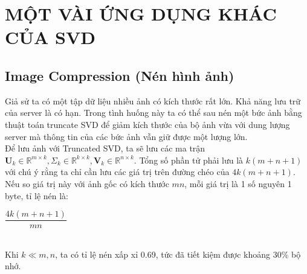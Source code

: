 \section{MỘT VÀI ỨNG DỤNG KHÁC CỦA SVD}
\subsection{Image Compression (Nén hình ảnh)}

Giả sử ta có một tập dữ liệu nhiều ảnh có kích thước rất lớn. Khả năng lưu trữ của server là có hạn. Trong tình huống này ta có thể sau nén một bức ảnh bằng thuật toán truncate SVD để giảm kích thước của bộ ảnh vừa với dung lượng server mà thông tin của các bức ảnh vẫn giữ được một lượng lớn.\\
Để lưu ảnh với Truncated SVD, ta sẽ lưu các ma trận $\mathbf{U}_k \in \mathbb{R}^{m \times k}, \Sigma_k \in \mathbb{R}^{k \times k}, \mathbf{V}_k \in \mathbb{R}^{n \times k}$. Tổng số phần tử phải lưu là $k(m + n + 1)$ với chú ý rằng ta chỉ cần lưu các giá trị trên đường chéo của $4k(m + n + 1)$. Nếu so giá trị này với ảnh gốc có kích thước $mn$, mỗi giá trị là 1 số nguyên 1 byte, tỉ lệ nén là:\\
\begin{center}
	$
	\dfrac{4k(m + n + 1)}{mn}$
\end{center}\\
Khi $k \ll m, n$, ta có tỉ lệ nén xấp xỉ 0.69, tức đã tiết kiệm được khoảng 30\% bộ nhớ.\\

